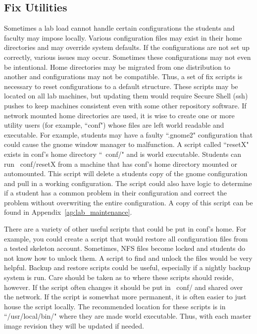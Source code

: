 \subsection{Fix Utilities}

Sometimes a lab load cannot handle certain configurations the students and faculty may impose locally.  Various configuration files may exist in their home directories and may override system defaults.  If the configurations are not set up correctly, various issues may occur.  Sometimes these configurations may not even be intentional.  Home directories may be migrated from one distribution to another and configurations may not be compatible.  Thus, a set of fix scripts is necessary to reset configurations to a default structure.  These scripts may be located on all lab machines, but updating them would require Secure Shell (ssh) pushes to keep machines consistent even with some other repository software.  If network mounted home directories are used, it is wise to create one or more utility users (for example, ``conf") whose files are left world readable and executable.  For example, students may have a faulty ``.gnome2" configuration that could cause the gnome window manager to malfunction.  A script called ``resetX" exists in conf's home directory ``~conf/" and is world executable.  Students can run ~conf/resetX from a machine that has conf's home directory mounted or automounted.  This script will delete a students copy of the gnome configuration and pull in a working configuration.  The script could also have logic to determine if a student has a common problem in their configuration and correct the problem without overwriting the entire configuration.  A copy of this script can be found in Appendix~\ref{ap:lab_maintenance}. 

There are a variety of other useful scripts that could be put in conf's home.  For example, you could create a script that would restore all configuration files from a tested skeleton account.  Sometimes, NFS files become locked and students do not know how to unlock them.  A script to find and unlock the files would be very helpful.  Backup and restore scripts could be useful, especially if a nightly backup system is run.  Care should be taken as to where these scripts should reside, however.  If the script often changes it should be put in ~conf/ and shared over the network.  If the script is somewhat more permanent, it is often easier to just house the script locally.  The recommended location for these scripts is in ``/usr/local/bin/" where they are made world executable.  Thus, with each master image revision they will be updated if needed.  
